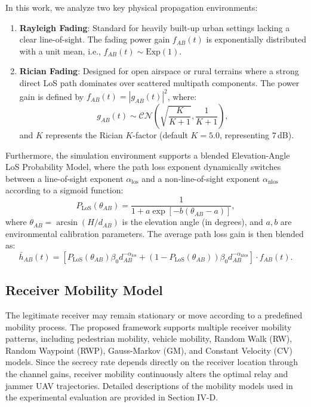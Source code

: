 \documentclass[journal,onecolumn]{IEEEtran}
\begin{document}
In this work, we analyze two key physical propagation environments:
\begin{enumerate}
    \item \textbf{Rayleigh Fading}: Standard for heavily built-up urban settings lacking a clear line-of-sight. The fading power gain $f_{AB}(t)$ is exponentially distributed with a unit mean, i.e., $f_{AB}(t) \sim \text{Exp}(1)$.
    \item \textbf{Rician Fading}: Designed for open airspace or rural terrains where a strong direct LoS path dominates over scattered multipath components. The power gain is defined by $f_{AB}(t) = |g_{AB}(t)|^2$, where:
    \begin{equation}g_{AB}(t) \sim \mathcal{CN}\left( \sqrt{\frac{K}{K+1}}, \frac{1}{K+1} \right),
    \end{equation}
    and $K$ represents the Rician $K$-factor (default $K=5.0$, representing $7$\,dB).
\end{enumerate}

Furthermore, the simulation environment supports a blended Elevation-Angle LoS Probability Model, where the path loss exponent dynamically switches between a line-of-sight exponent $\alpha_{\text{los}}$ and a non-line-of-sight exponent $\alpha_{\text{nlos}}$ according to a sigmoid function:
\begin{equation}
    P_{\text{LoS}}(\theta_{AB}) = \frac{1}{1 + a \exp\left[-b(\theta_{AB} - a)\right]},
\end{equation}
where $\theta_{AB} = \arcsin(H / d_{AB})$ is the elevation angle (in degrees), and $a, b$ are environmental calibration parameters. The average path loss gain is then blended as:
\begin{equation}
    \bar{h}_{AB}(t) = \left[ P_{\text{LoS}}(\theta_{AB}) \beta_0 d_{AB}^{-\alpha_{\text{los}}} + (1 - P_{\text{LoS}}(\theta_{AB})) \textstyle \beta_0 d_{AB}^{-\alpha_{\text{nlos}}} \right] \cdot f_{AB}(t).
\end{equation}

\subsection{Receiver Mobility Model}

The legitimate receiver may remain stationary or move according to a predefined mobility process. The proposed framework supports multiple receiver mobility patterns, including pedestrian mobility, vehicle mobility, Random Walk (RW), Random Waypoint (RWP), Gauss-Markov (GM), and Constant Velocity (CV) models. Since the secrecy rate depends directly on the receiver location through the channel gains, receiver mobility continuously alters the optimal relay and jammer UAV trajectories. Detailed descriptions of the mobility models used in the experimental evaluation are provided in Section IV-D.
\end{document}

